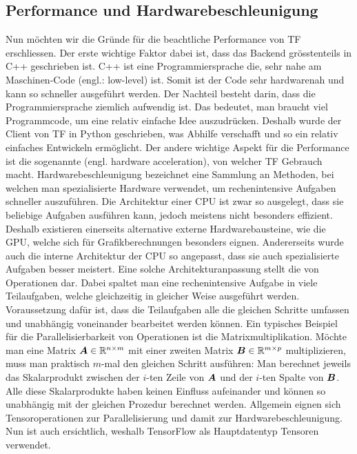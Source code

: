 \begin{appendices}
\section*{Performance und Hardwarebeschleunigung}
Nun möchten wir die Gründe für die beachtliche Performance von TF erschliessen.
Der erste wichtige Faktor dabei ist, dass das Backend grösstenteils in C++
geschrieben ist. C++ ist eine Programmiersprache die, sehr nahe am Maschinen-Code
(engl.: low-level) ist. Somit ist der Code sehr hardwarenah und kann so
schneller ausgeführt werden. Der Nachteil besteht darin, dass die Programmiersprache
ziemlich aufwendig ist. Das bedeutet, man braucht viel Programmcode, um eine relativ einfache Idee
auszudrücken. Deshalb wurde der Client von TF in Python geschrieben, was
Abhilfe verschafft und so ein relativ einfaches Entwickeln ermöglicht.
\para{}
Der andere wichtige Aspekt für die Performance ist die sogenannte
 (engl. hardware acceleration), von welcher TF
Gebrauch macht.
Hardwarebeschleunigung bezeichnet eine Sammlung an Methoden,
bei welchen man spezialisierte Hardware verwendet, um rechenintensive Aufgaben
schneller auszuführen. Die Architektur einer CPU ist zwar so ausgelegt, dass
sie beliebige Aufgaben ausführen kann, jedoch meistens nicht besonders
effizient. Deshalb existieren einerseits alternative externe Hardwarebausteine, wie die
GPU, welche sich für Grafikberechnungen besonders eignen.
Andererseits wurde auch die interne Architektur der CPU so angepasst, dass sie
auch spezialisierte Aufgaben besser meistert.
\para{}
Eine solche Architekturanpassung stellt die
 von Operationen dar. Dabei spaltet man eine
rechenintensive Aufgabe in viele Teilaufgaben, welche gleichzeitig in
gleicher Weise ausgeführt werden. Voraussetzung dafür ist, dass die
Teilaufgaben alle die gleichen Schritte umfassen und unabhängig voneinander bearbeitet werden können.
Ein typisches Beispiel für die Parallelisierbarkeit von Operationen ist die
Matrixmultiplikation. Möchte man eine Matrix $\bm{A} \in \mathbb{R}^{n \times m}$ mit
einer zweiten Matrix $\bm{B} \in \mathbb{R}^{m \times p}$ multiplizieren, muss man
praktisch $m$-mal den gleichen Schritt ausführen: Man berechnet jeweils das
Skalarprodukt zwischen der $i$-ten Zeile von $\bm{A}$ und der $i$-ten Spalte
von $\bm{B}$. Alle diese Skalarprodukte haben keinen Einfluss aufeinander und
können so unabhängig mit der gleichen Prozedur berechnet werden.
\para{}
Allgemein eignen sich Tensoroperationen zur Parallelisierung und damit zur Hardwarebeschleunigung.
Nun ist auch ersichtlich, weshalb TensorFlow als Hauptdatentyp Tensoren
verwendet.


\end{appendices}
